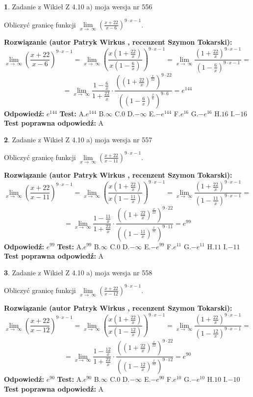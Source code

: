 \documentclass[12pt, a4paper]{article}
\theoremstyle{definition} %
\newtheorem{zad}{}
\newcommand{\zadStart}[1]{\begin{zad}#1\newline}
\newcommand{\zadStop}{\end{zad}}
\newcommand{\rozwStart}[2]{\noindent \textbf{Rozwiązanie (autor #1 , recenzent #2): }\newline}
\newcommand{\rozwStop}{\newline}
\newcommand{\odpStart}{\noindent \textbf{Odpowiedź:}\newline}
\newcommand{\odpStop}{\newline}
\newcommand{\testStart}{\noindent \textbf{Test:}\newline}
\newcommand{\testStop}{\newline}
\newcommand{\kluczStart}{\noindent \textbf{Test poprawna odpowiedź:}\newline}
\newcommand{\kluczStop}{\newline}
\begin{document}
\zadStart{Zadanie z Wikieł Z 4.10 a) moja wersja nr 556}

Obliczyć granicę funkcji  $\lim\limits_{x\to\ \infty}(\frac{x+22}{x-6})^{9\cdot x-1}$.
\zadStop
\rozwStart{Patryk Wirkus}{Szymon Tokarski}
$$\lim\limits_{x\to\ \infty}(\frac{x+22}{x-6})^{9\cdot x-1} = \lim\limits_{x\to\ \infty}(\frac{x(1+\frac{22}{x})}{x(1-\frac{6}{x})})^{9\cdot x-1}=\lim\limits_{x\to\ \infty}\frac{(1+\frac{22}{x})^{9\cdot x-1}}{(1-\frac{6}{x})^{9\cdot x-1}}=$$
$$=\lim\limits_{x\to\ \infty}\frac{1-\frac{6}{x}}{1+\frac{22}{x}}\cdot\frac{((1+\frac{22}{x})^{\frac{x}{22}})^{9\cdot22}}{((1-\frac{6}{x})^{\frac{x}{6}})^{9\cdot6}}=e^{144}$$
\rozwStop
\odpStart
$e^{144}$
\odpStop
\testStart
A.$e^{144}$ B.$\infty$ C.$0$ D.$-\infty$ E.$-e^{144}$
F.$e^{16}$ G.$-e^{16}$
H.$16$
I.$-16$
\testStop
\kluczStart
A
\kluczStop



\zadStart{Zadanie z Wikieł Z 4.10 a) moja wersja nr 557}

Obliczyć granicę funkcji  $\lim\limits_{x\to\ \infty}(\frac{x+22}{x-11})^{9\cdot x-1}$.
\zadStop
\rozwStart{Patryk Wirkus}{Szymon Tokarski}
$$\lim\limits_{x\to\ \infty}(\frac{x+22}{x-11})^{9\cdot x-1} = \lim\limits_{x\to\ \infty}(\frac{x(1+\frac{22}{x})}{x(1-\frac{11}{x})})^{9\cdot x-1}=\lim\limits_{x\to\ \infty}\frac{(1+\frac{22}{x})^{9\cdot x-1}}{(1-\frac{11}{x})^{9\cdot x-1}}=$$
$$=\lim\limits_{x\to\ \infty}\frac{1-\frac{11}{x}}{1+\frac{22}{x}}\cdot\frac{((1+\frac{22}{x})^{\frac{x}{22}})^{9\cdot22}}{((1-\frac{11}{x})^{\frac{x}{11}})^{9\cdot11}}=e^{99}$$
\rozwStop
\odpStart
$e^{99}$
\odpStop
\testStart
A.$e^{99}$ B.$\infty$ C.$0$ D.$-\infty$ E.$-e^{99}$
F.$e^{11}$ G.$-e^{11}$
H.$11$
I.$-11$
\testStop
\kluczStart
A
\kluczStop



\zadStart{Zadanie z Wikieł Z 4.10 a) moja wersja nr 558}

Obliczyć granicę funkcji  $\lim\limits_{x\to\ \infty}(\frac{x+22}{x-12})^{9\cdot x-1}$.
\zadStop
\rozwStart{Patryk Wirkus}{Szymon Tokarski}
$$\lim\limits_{x\to\ \infty}(\frac{x+22}{x-12})^{9\cdot x-1} = \lim\limits_{x\to\ \infty}(\frac{x(1+\frac{22}{x})}{x(1-\frac{12}{x})})^{9\cdot x-1}=\lim\limits_{x\to\ \infty}\frac{(1+\frac{22}{x})^{9\cdot x-1}}{(1-\frac{12}{x})^{9\cdot x-1}}=$$
$$=\lim\limits_{x\to\ \infty}\frac{1-\frac{12}{x}}{1+\frac{22}{x}}\cdot\frac{((1+\frac{22}{x})^{\frac{x}{22}})^{9\cdot22}}{((1-\frac{12}{x})^{\frac{x}{12}})^{9\cdot12}}=e^{90}$$
\rozwStop
\odpStart
$e^{90}$
\odpStop
\testStart
A.$e^{90}$ B.$\infty$ C.$0$ D.$-\infty$ E.$-e^{90}$
F.$e^{10}$ G.$-e^{10}$
H.$10$
I.$-10$
\testStop
\kluczStart
A
\kluczStop
\end{document}
